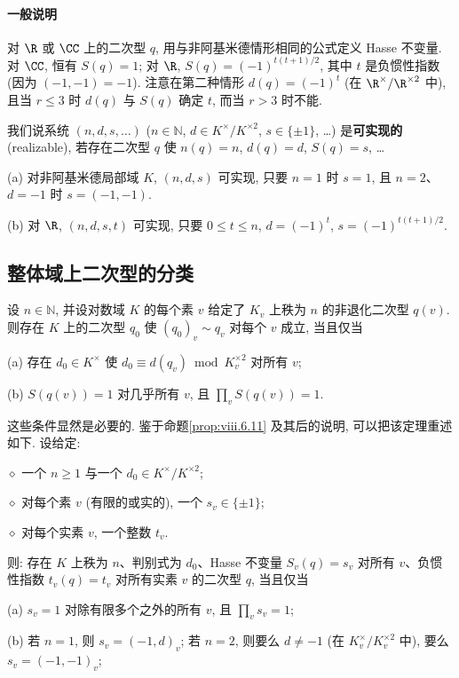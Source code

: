 \paragraph{一般说明}
对 $\R$ 或 $\CC$ 上的二次型 $q$, 用与非阿基米德情形相同的公式定义 Hasse 不变量. 对 $\CC$, 恒有 $S(q)=1$; 对 $\R$, $S(q)=(-1)^{t(t+1)/2}$, 其中 $t$ 是负惯性指数 (因为 $(-1,-1)=-1$). 注意在第二种情形 $d(q)=(-1)^{t}$ (在 $\R^{\times}/\R^{\times 2}$ 中), 且当 $r\le 3$ 时 $d(q)$ 与 $S(q)$ 确定 $t$, 而当 $r>3$ 时不能.

我们说系统 $(n,d,s,\ldots)$ ($n\in\mathbb{N}$, $d\in K^{\times}/K^{\times 2}$, $s\in\{\pm1\}$, \ldots) 是\textbf{可实现的} (realizable), 若存在二次型 $q$ 使 $n(q)=n$, $d(q)=d$, $S(q)=s$, \ldots

(a) 对非阿基米德局部域 $K$, $(n,d,s)$ 可实现, 只要 $n=1$ 时 $s=1$, 且 $n=2$、$d=-1$ 时 $s=(-1,-1)$.

(b) 对 $\R$, $(n,d,s,t)$ 可实现, 只要 $0\le t\le n$, $d=(-1)^{t}$, $s=(-1)^{t(t+1)/2}$.

\subsection*{整体域上二次型的分类}

\begin{theorem}\label{thm:viii.6.12}
设 $n\in\mathbb{N}$, 并设对数域 $K$ 的每个素 $v$ 给定了 $K_v$ 上秩为 $n$ 的非退化二次型 $q(v)$. 则存在 $K$ 上的二次型 $q_0$ 使 $(q_0)_v\sim q_v$ 对每个 $v$ 成立, 当且仅当

(a) 存在 $d_0\in K^{\times}$ 使 $d_0\equiv d(q_v) \bmod K_v^{\times 2}$ 对所有 $v$;

(b) $S(q(v))=1$ 对几乎所有 $v$, 且 $\prod_{v}S(q(v))=1$.
\end{theorem}

这些条件显然是必要的. 鉴于命题\ref{prop:viii.6.11} 及其后的说明, 可以把该定理重述如下. 设给定:

$\diamond$ 一个 $n\ge 1$ 与一个 $d_0\in K^{\times}/K^{\times 2}$;

$\diamond$ 对每个素 $v$ (有限的或实的), 一个 $s_v\in\{\pm 1\}$;

$\diamond$ 对每个实素 $v$, 一个整数 $t_v$.

则: 存在 $K$ 上秩为 $n$、判别式为 $d_0$、Hasse 不变量 $S_v(q)=s_v$ 对所有 $v$、负惯性指数 $t_v(q)=t_v$ 对所有实素 $v$ 的二次型 $q$, 当且仅当

(a) $s_v=1$ 对除有限多个之外的所有 $v$, 且 $\prod_v s_v=1$;

(b) 若 $n=1$, 则 $s_v=(-1,d)_v$; 若 $n=2$, 则要么 $d\ne -1$ (在 $K_v^{\times}/K_v^{\times 2}$ 中), 要么 $s_v=(-1,-1)_v$;

